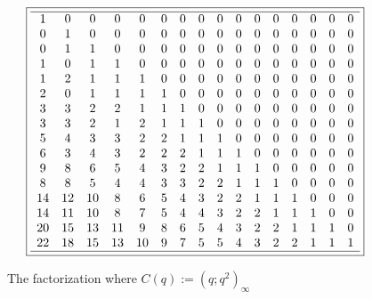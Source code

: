 \documentclass[10pt,reqno]{amsart}
\numberwithin{figure}{section}
\numberwithin{table}{section}
\theoremstyle{plain}
\numberwithin{theorem}{section}
\theoremstyle{remark}
\begin{document}
\begin{figure}[ht!]
\begin{minipage}{\linewidth} 
\begin{center} 
\tiny 
\begin{equation*} 
\boxed{ 
\begin{array}{cccccccccccccccccc} \hline 
 1 & 0 & 0 & 0 & 0 & 0 & 0 & 0 & 0 & 0 & 0 & 0 & 0 & 0 & 0 & 0 \\
 0 & 1 & 0 & 0 & 0 & 0 & 0 & 0 & 0 & 0 & 0 & 0 & 0 & 0 & 0 & 0 \\
 0 & 1 & 1 & 0 & 0 & 0 & 0 & 0 & 0 & 0 & 0 & 0 & 0 & 0 & 0 & 0 \\
 1 & 0 & 1 & 1 & 0 & 0 & 0 & 0 & 0 & 0 & 0 & 0 & 0 & 0 & 0 & 0 \\
 1 & 2 & 1 & 1 & 1 & 0 & 0 & 0 & 0 & 0 & 0 & 0 & 0 & 0 & 0 & 0 \\
 2 & 0 & 1 & 1 & 1 & 1 & 0 & 0 & 0 & 0 & 0 & 0 & 0 & 0 & 0 & 0 \\
 3 & 3 & 2 & 2 & 1 & 1 & 1 & 0 & 0 & 0 & 0 & 0 & 0 & 0 & 0 & 0 \\
 3 & 3 & 2 & 1 & 2 & 1 & 1 & 1 & 0 & 0 & 0 & 0 & 0 & 0 & 0 & 0 \\
 5 & 4 & 3 & 3 & 2 & 2 & 1 & 1 & 1 & 0 & 0 & 0 & 0 & 0 & 0 & 0 \\
 6 & 3 & 4 & 3 & 2 & 2 & 2 & 1 & 1 & 1 & 0 & 0 & 0 & 0 & 0 & 0 \\
 9 & 8 & 6 & 5 & 4 & 3 & 2 & 2 & 1 & 1 & 1 & 0 & 0 & 0 & 0 & 0 \\
 8 & 8 & 5 & 4 & 4 & 3 & 3 & 2 & 2 & 1 & 1 & 1 & 0 & 0 & 0 & 0 \\
 14 & 12 & 10 & 8 & 6 & 5 & 4 & 3 & 2 & 2 & 1 & 1 & 1 & 0 & 0 & 0 \\
 14 & 11 & 10 & 8 & 7 & 5 & 4 & 4 & 3 & 2 & 2 & 1 & 1 & 1 & 0 & 0 \\
 20 & 15 & 13 & 11 & 9 & 8 & 6 & 5 & 4 & 3 & 2 & 2 & 1 & 1 & 1 & 0 \\
 22 & 18 & 15 & 13 & 10 & 9 & 7 & 5 & 5 & 4 & 3 & 2 & 2 & 1 & 1 & 1 \\
 \hline 
\end{array}
} 
\end{equation*} 
\end{center} 
\end{minipage}

\caption{The factorization where $C(q) := (q; q^2)_{\infty}$} 
\label{figure_factpair_v3} 

\end{figure} 
\end{document}
